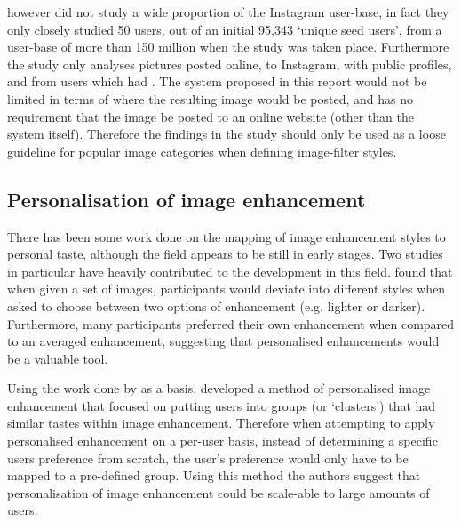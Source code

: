 \documentclass[a4paper,12pt]{report}
\begin{document}
      \cite{hu2014we} however did not study a wide proportion of the Instagram user-base, in fact they only closely studied 50 users, out of an initial 95,343 ‘unique seed users’, from a user-base of more than 150 million when the study was taken place. Furthermore the study only analyses pictures posted online, to Instagram, with public profiles, and from users which had . The system proposed in this report would not be limited in terms of where the resulting image would be posted, and has no requirement that the image be posted to an online website (other than the system itself). Therefore the findings in the study should only be used as a loose guideline for popular image categories when defining image-filter styles.

    \subsection{Personalisation of image enhancement}
      There has been some work done on the mapping of image enhancement styles to personal taste, although the field appears to be still in early stages. Two studies in particular have heavily contributed to the development in this field. \cite{kang2010personalization} found that when given a set of images, participants would deviate into different styles when asked to choose between two options of enhancement (e.g. lighter or darker). Furthermore, many participants preferred their own enhancement when compared to an averaged enhancement, suggesting that personalised enhancements would be a valuable tool.

      Using the work done by \cite{kang2010personalization} as a basis, \cite{caicedo2011collaborative} developed a method of personalised image enhancement that focused on putting users into groups (or ‘clusters’) that had similar tastes within image enhancement. Therefore when attempting to apply personalised enhancement on a per-user basis, instead of determining a specific users preference from scratch, the user's preference would only have to be mapped to a pre-defined group. Using this method the authors suggest that personalisation of image enhancement could be scale-able to large amounts of users.

  \newpage
\end{document}

